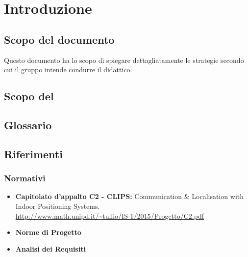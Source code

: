 \section{Introduzione}
\subsection{Scopo del documento} 
Questo documento ha lo scopo di spiegare dettagliatamente le strategie secondo cui il gruppo \AUTORE{} intende condurre il  didattico. 
\subsection{Scopo del }
\SCOPO
\subsection{Glossario}
\GLOSSARIO
\subsection{Riferimenti}
\subsubsection{Normativi}
\begin{itemize}
	\item \textbf{Capitolato d'appalto C2 - CLIPS:} Communication \& Localisation with Indoor Positioning Systems. \\
	\url{http://www.math.unipd.it/~tullio/IS-1/2015/Progetto/C2.pdf}
	\item \textbf{Norme di Progetto} \\ \NPdoc
	\item \textbf{Analisi dei Requisiti} \\ \ARdoc
\end{itemize}	


